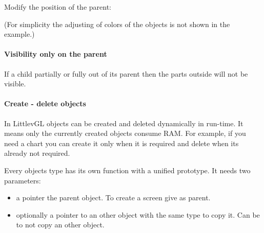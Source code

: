 \documentclass[letterpaper,10pt,english]{sphinxmanual}
\begin{document}
Modify the position of the parent:


\begin{sphinxVerbatim}[commandchars=\\\{\}]
  	
\end{sphinxVerbatim}

(For simplicity the adjusting of colors of the objects is not shown in the example.)


\paragraph{Visibility only on the parent}
\label{\detokenize{overview/objects:visibility-only-on-the-parent}}
If a child partially or fully out of its parent then the parts outside will not be visible.


\begin{sphinxVerbatim}[commandchars=\\\{\}]
 	
\end{sphinxVerbatim}


\paragraph{Create - delete objects}
\label{\detokenize{overview/objects:create-delete-objects}}
In LittlevGL objects can be created and deleted dynamically in run-time.
It means only the currently created objects consume RAM.
For example, if you need a chart you can create it only when it is required and delete when its already not required.

Every objects type has its own  function with a unified prototype.
It needs two parameters:
\begin{itemize}
\item {} 
a pointer the parent object. To create a screen give  as parent.

\item {} 
optionally a pointer to an other object with the same type to copy it. Can be  to not copy an other object.

\end{itemize}
\end{document}
